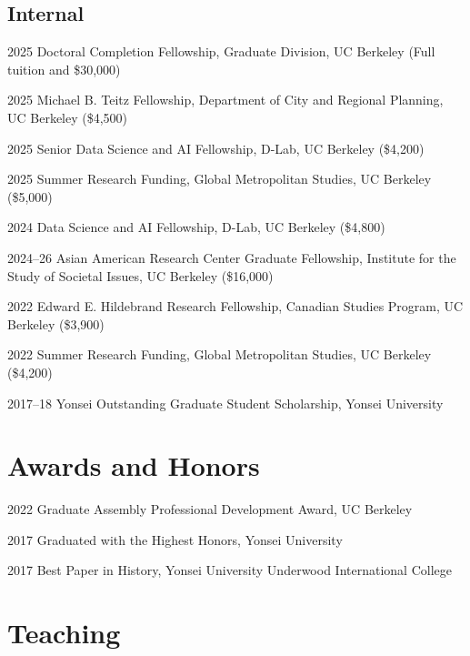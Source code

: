 \documentclass[11pt,letterpaper]{article}
\newcommand{\money}[1]{(\$#1)}
\newcommand{\term}[1]{(#1)}
\begin{document}
\subsection{Internal}
\begin{tablist}
  \item[2025] \tab{}Doctoral Completion Fellowship, Graduate Division, UC Berkeley \term{Full tuition and \$30,000}
  \item[2025] \tab{}Michael B. Teitz Fellowship, Department of City and Regional Planning, UC Berkeley \money{4,500}
  \item[2025] \tab{}Senior Data Science and AI Fellowship, D-Lab, UC Berkeley \money{4,200}
  \item[2025] \tab{}Summer Research Funding, Global Metropolitan Studies, UC Berkeley \money{5,000}
  \item[2024] \tab{}Data Science and AI Fellowship, D-Lab, UC Berkeley \money{4,800}
  \item[2024–26] \tab{}Asian American Research Center Graduate Fellowship, Institute for the Study of Societal Issues, UC Berkeley \money{16,000}
  \item[2022] \tab{}Edward E. Hildebrand Research Fellowship, Canadian Studies Program, UC Berkeley \money{3,900}
  \item[2022] \tab{}Summer Research Funding, Global Metropolitan Studies, UC Berkeley \money{4,200}
  \item[2017–18] \tab{}Yonsei Outstanding Graduate Student Scholarship, Yonsei University
\end{tablist}

\section{Awards and Honors}
\begin{tablist}
  \item[2022] \tab{}Graduate Assembly Professional Development Award, UC Berkeley
  \item[2017] \tab{}Graduated with the Highest Honors, Yonsei University
  \item[2017] \tab{}Best Paper in History, Yonsei University Underwood International College
\end{tablist}

\section{Teaching}
\end{document}
